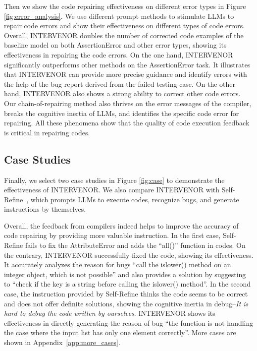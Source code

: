 \documentclass[11pt]{article}
\begin{document}
Then we show the code repairing effectiveness on different error types in Figure \ref{fig:error_analysis}. We use different prompt methods to stimulate LLMs to repair code errors and show their effectiveness on different types of code errors. Overall, INTERVENOR doubles the number of corrected code examples of the baseline model on both AssertionError and other error types, showing its effectiveness in repairing the code errors. On the one hand, INTERVENOR significantly outperforms other methods on the AssertionError task.  It illustrates that INTERVENOR can provide more precise guidance and identify errors with the help of the bug report derived from the failed testing case. On the other hand, INTERVENOR also shows a strong ability to correct other code errors. Our chain-of-repairing method also thrives on the error messages of the compiler, breaks the cognitive inertia of LLMs, and identifies the specific code error for repairing. All these phenomena show that the quality of code execution feedback is critical in repairing codes.




\subsection{Case Studies}
Finally, we select two case studies in Figure \ref{fig:case} to demonstrate the effectiveness of INTERVENOR. We also compare INTERVENOR with Self-Refine~\cite{madaan2023selfrefine}, which prompts LLMs to execute codes, recognize bugs, and generate instructions by themselves.

Overall, the feedback from compilers indeed helps to improve the accuracy of code repairing by providing more valuable instruction. In the first case, Self-Refine fails to fix the AttributeError and adds the ``all()'' function in codes. On the contrary, INTERVENOR successfully fixed the code, showing its effectiveness. It accurately analyzes the reason for bugs ``call the islower() method on an integer object, which is not possible'' and also provides a solution by suggesting to ``check if the key is a string before calling the islower() method''. In the second case, the instruction provided by Self-Refine thinks the code seems to be correct and does not offer definite solutions, showing the cognitive inertia in debug--\textit{It is hard to debug the code written by ourselves}. INTERVENOR shows its effectiveness in directly generating the reason of bug ``the function is not handling the case where the input list has only one element correctly''. More cases are shown in Appendix~\ref{app:more_cases}.
\end{document}
